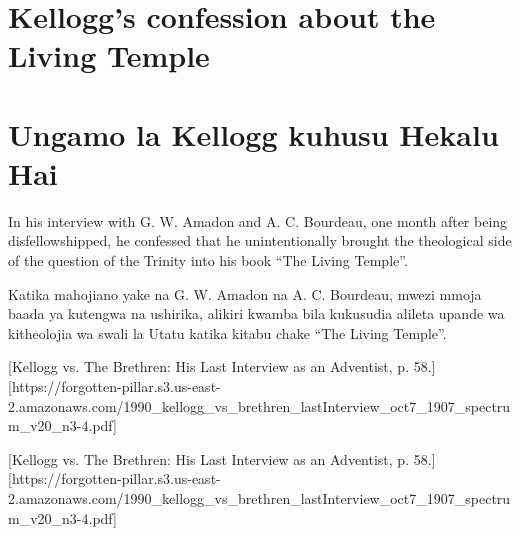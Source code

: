 \section*{Kellogg’s confession about the Living Temple}


\section*{Ungamo la Kellogg kuhusu Hekalu Hai}


In his interview with G. W. Amadon and A. C. Bourdeau, one month after being disfellowshipped, he confessed that he unintentionally brought the theological side of the question of the Trinity into his book “The Living Temple”.


Katika mahojiano yake na G. W. Amadon na A. C. Bourdeau, mwezi mmoja baada ya kutengwa na ushirika, alikiri kwamba bila kukusudia alileta upande wa kitheolojia wa swali la Utatu katika kitabu chake “The Living Temple”.


[Kellogg vs. The Brethren: His Last Interview as an Adventist, p. 58.][https://forgotten-pillar.s3.us-east-2.amazonaws.com/1990\_kellogg\_vs\_brethren\_lastInterview\_oct7\_1907\_spectrum\_v20\_n3-4.pdf]


[Kellogg vs. The Brethren: His Last Interview as an Adventist, p. 58.][https://forgotten-pillar.s3.us-east-2.amazonaws.com/1990\_kellogg\_vs\_brethren\_lastInterview\_oct7\_1907\_spectrum\_v20\_n3-4.pdf]


